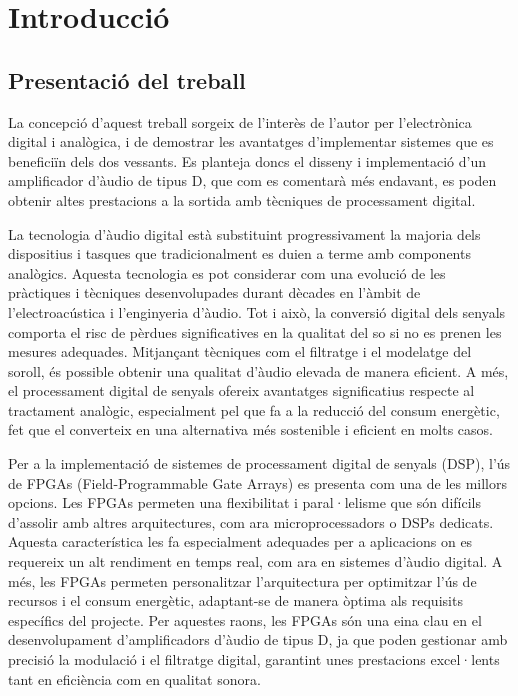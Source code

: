 \chapter{Introducció}
\section{Presentació del treball}
\par La concepció d'aquest treball sorgeix de l'interès de l'autor per l'electrònica digital i analògica, i de demostrar les avantatges d'implementar sistemes que es beneficiïn dels dos vessants. Es planteja doncs el disseny i implementació d'un amplificador d'àudio de tipus D, que com es comentarà més endavant, es poden obtenir altes prestacions a la sortida amb tècniques de processament digital.  
\par La tecnologia d'àudio digital està substituint progressivament la majoria dels dispositius i tasques que tradicionalment es duien a terme amb components analògics. Aquesta tecnologia es pot considerar com una evolució de les pràctiques i tècniques desenvolupades durant dècades en l'àmbit de l'electroacústica i l'enginyeria d'àudio. Tot i això, la conversió digital dels senyals comporta el risc de pèrdues significatives en la qualitat del so si no es prenen les mesures adequades. Mitjançant tècniques com el filtratge i el modelatge del soroll, és possible obtenir una qualitat d'àudio elevada de manera eficient. A més, el processament digital de senyals ofereix avantatges significatius respecte al tractament analògic, especialment pel que fa a la reducció del consum energètic, fet que el converteix en una alternativa més sostenible i eficient en molts casos. 
\par Per a la implementació de sistemes de processament digital de senyals (DSP), l’ús de FPGAs (Field-Programmable Gate Arrays) es presenta com una de les millors opcions. Les FPGAs permeten una flexibilitat i paral·lelisme que són difícils d’assolir amb altres arquitectures, com ara microprocessadors o DSPs dedicats. Aquesta característica les fa especialment adequades per a aplicacions on es requereix un alt rendiment en temps real, com ara en sistemes d'àudio digital. A més, les FPGAs permeten personalitzar l'arquitectura per optimitzar l'ús de recursos i el consum energètic, adaptant-se de manera òptima als requisits específics del projecte. Per aquestes raons, les FPGAs són una eina clau en el desenvolupament d’amplificadors d’àudio de tipus D, ja que poden gestionar amb precisió la modulació i el filtratge digital, garantint unes prestacions excel·lents tant en eficiència com en qualitat sonora.

